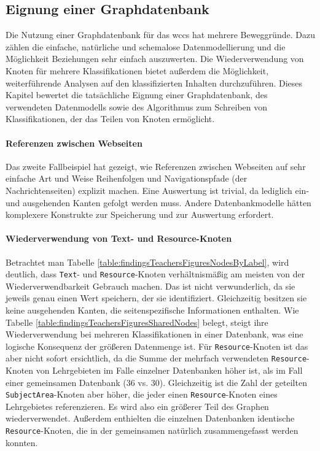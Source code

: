 \subsection{Eignung einer Graphdatenbank}
    Die Nutzung einer Graphdatenbank für das \gls{wccs} hat mehrere Beweggründe.
    Dazu zählen die einfache, natürliche und schemalose Datenmodellierung
    und die Möglichkeit Beziehungen sehr einfach auszuwerten.
    Die Wiederverwendung von Knoten für mehrere Klassifikationen
    bietet außerdem die Möglichkeit, weiterführende Analysen auf den
    klassifizierten Inhalten durchzuführen.
    Dieses Kapitel bewertet die tatsächliche Eignung einer Graphdatenbank,
    des verwendeten Datenmodells sowie des Algorithmus
    zum Schreiben von Klassifikationen, der das Teilen von Knoten ermöglicht.

    \paragraph*{Referenzen zwischen Webseiten}
    Das zweite Fallbeispiel hat gezeigt,
    wie Referenzen zwischen Webseiten auf sehr einfache Art und Weise
    Reihenfolgen und Navigationspfade (der Nachrichtenseiten) explizit machen.
    Eine Auswertung ist trivial, da lediglich ein- und ausgehenden Kanten gefolgt werden muss.
    Andere Datenbankmodelle hätten komplexere Konstrukte
    zur Speicherung und zur Auswertung erfordert.

    \paragraph*{Wiederverwendung von Text- und Resource-Knoten}
    Betrachtet man Tabelle \ref{table:findingsTeachersFiguresNodesByLabel}, wird deutlich,
    dass \texttt{Text}- und \texttt{Resource}-Knoten verhältnismäßig am meisten von der
    Wiederverwendbarkeit Gebrauch machen.
    Das ist nicht verwunderlich, da sie jeweils genau einen Wert speichern,
    der sie identifiziert.
    Gleichzeitig besitzen sie keine ausgehenden Kanten,
    die seitenspezifische Informationen enthalten.
    Wie Tabelle \ref{table:findingsTeachersFiguresSharedNodes} belegt,
    steigt ihre Wiederverwendung bei mehreren Klassifikationen in einer Datenbank,
    was eine logische Konsequenz der größeren Datenmenge ist.
    Für \texttt{Resource}-Knoten ist das aber nicht sofort ersichtlich, da
    die Summe der mehrfach verwendeten \texttt{Resource}-Knoten von Lehrgebieten
    im Falle einzelner Datenbanken höher ist, als im Fall einer gemeinsamen Datenbank (36 vs. 30).
    Gleichzeitig ist die Zahl der geteilten \texttt{SubjectArea}-Knoten aber höher,
    die jeder einen \texttt{Resource}-Knoten eines Lehrgebietes referenzieren.
    Es wird also ein größerer Teil des Graphen wiederverwendet.
    Außerdem enthielten die einzelnen Datenbanken identische \texttt{Resource}-Knoten,
    die in der gemeinsamen natürlich zusammengefasst werden konnten.

